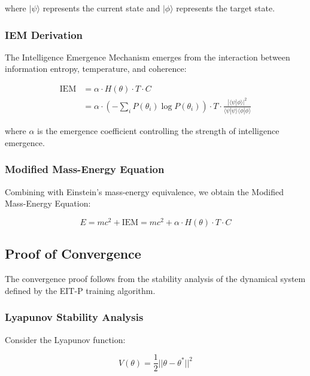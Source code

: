 \documentclass[12pt]{article}
\begin{document}
where $|\psi\rangle$ represents the current state and $|\phi\rangle$ represents the target state.

\subsubsection{IEM Derivation}

The Intelligence Emergence Mechanism emerges from the interaction between information entropy, temperature, and coherence:

\begin{align}
\text{IEM} &= \alpha \cdot H(\theta) \cdot T \cdot C \\
&= \alpha \cdot \left(-\sum_{i} P(\theta_i) \log P(\theta_i)\right) \cdot T \cdot \frac{|\langle \psi | \phi \rangle|^2}{\langle \psi | \psi \rangle \langle \phi | \phi \rangle}
\end{align}

where $\alpha$ is the emergence coefficient controlling the strength of intelligence emergence.

\subsubsection{Modified Mass-Energy Equation}

Combining with Einstein's mass-energy equivalence, we obtain the Modified Mass-Energy Equation:

\begin{equation}
E = mc^2 + \text{IEM} = mc^2 + \alpha \cdot H(\theta) \cdot T \cdot C
\end{equation}

\subsection{Proof of Convergence}

The convergence proof follows from the stability analysis of the dynamical system defined by the EIT-P training algorithm.

\subsubsection{Lyapunov Stability Analysis}

Consider the Lyapunov function:

\begin{equation}
V(\theta) = \frac{1}{2}||\theta - \theta^*||^2
\end{equation}
\end{document}
